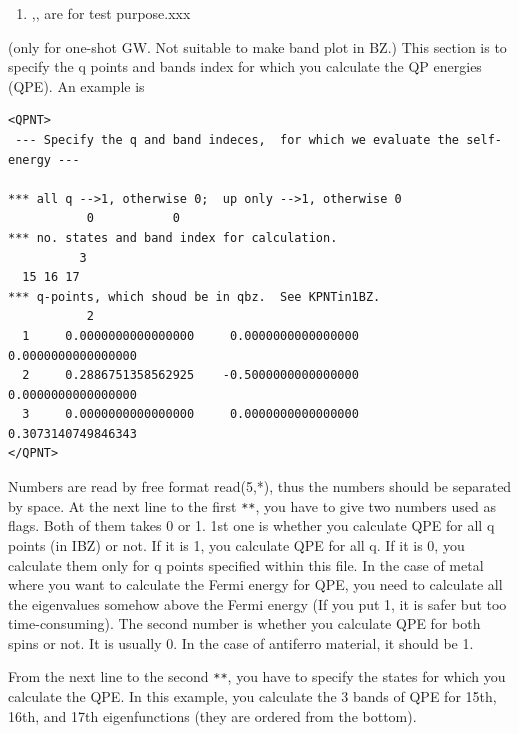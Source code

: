 {\begin{enumerate}


\item 
{},,
are for test purpose.xxx

\end{enumerate}


(only for one-shot GW. Not suitable to make band plot in BZ.)
This section is to specify the q points and bands index for which you calculate 
the QP energies (QPE). An example is
{\baselineskip=2.6mm
\begin{verbatim}
<QPNT>
 --- Specify the q and band indeces,  for which we evaluate the self-energy ---

*** all q -->1, otherwise 0;  up only -->1, otherwise 0
           0           0
*** no. states and band index for calculation.
          3
  15 16 17 
*** q-points, which shoud be in qbz.  See KPNTin1BZ.
           2
  1     0.0000000000000000     0.0000000000000000     0.0000000000000000
  2     0.2886751358562925    -0.5000000000000000     0.0000000000000000
  3     0.0000000000000000     0.0000000000000000     0.3073140749846343
</QPNT>
\end{verbatim}}
Numbers are read by free format read(5,*), 
thus the numbers should be separated by space.
At the next line to the first {\tt ***},
you have to give two numbers used as flags. 
Both of them takes 0 or 1.
1st one is whether you calculate QPE for all q points (in IBZ) or not.
If it is 1, you calculate  QPE for all q. If it is 0, you calculate them only for
q points specified within this file. In the case of metal where you want to calculate the Fermi energy for QPE,
you need to calculate all the eigenvalues somehow above the Fermi energy
(If you put 1, it is safer but too time-consuming).
The second number is whether you calculate QPE for
both spins or not. 
It is usually 0. In the case of antiferro material, 
it should be 1.

From the next line to the second {\tt ***},
you have to specify the states for which you calculate the QPE.
In this example, you calculate the 3 bands of QPE for
15th, 16th, and 17th eigenfunctions 
(they are ordered from the bottom).

}
